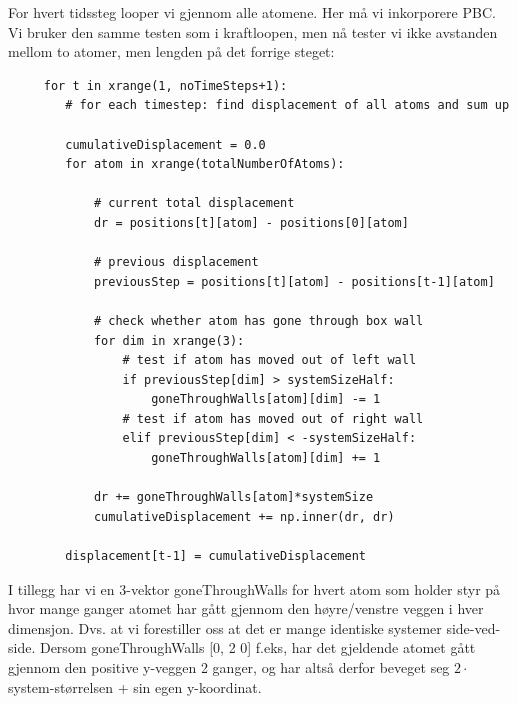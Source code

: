 \documentclass[english, a4paper]{article}
\begin{document}
\noindent
For hvert tidssteg looper vi gjennom alle atomene. Her må vi inkorporere PBC. Vi bruker den samme testen
som i kraftloopen, men nå tester vi ikke avstanden mellom to atomer, men lengden på det forrige steget:
\begin{lstlisting}
     for t in xrange(1, noTimeSteps+1):
        # for each timestep: find displacement of all atoms and sum up

        cumulativeDisplacement = 0.0
        for atom in xrange(totalNumberOfAtoms):

            # current total displacement
            dr = positions[t][atom] - positions[0][atom]

            # previous displacement
            previousStep = positions[t][atom] - positions[t-1][atom]

            # check whether atom has gone through box wall
            for dim in xrange(3):
                # test if atom has moved out of left wall
                if previousStep[dim] > systemSizeHalf: 
                    goneThroughWalls[atom][dim] -= 1	
                # test if atom has moved out of right wall
                elif previousStep[dim] < -systemSizeHalf:
                    goneThroughWalls[atom][dim] += 1
       
            dr += goneThroughWalls[atom]*systemSize
            cumulativeDisplacement += np.inner(dr, dr) 
    
        displacement[t-1] = cumulativeDisplacement
\end{lstlisting}
I tillegg har vi en 3-vektor goneThroughWalls for hvert atom som holder styr på hvor mange ganger
atomet har gått gjennom den høyre/venstre veggen i hver dimensjon. Dvs. at vi forestiller oss
at det er mange identiske systemer side-ved-side. Dersom goneThroughWalls [0, 2 0] f.eks,
har det gjeldende atomet gått gjennom den positive y-veggen 2 ganger, og har altså derfor
beveget seg $2 \cdot$ system-størrelsen + sin egen y-koordinat.\\
\end{document}
